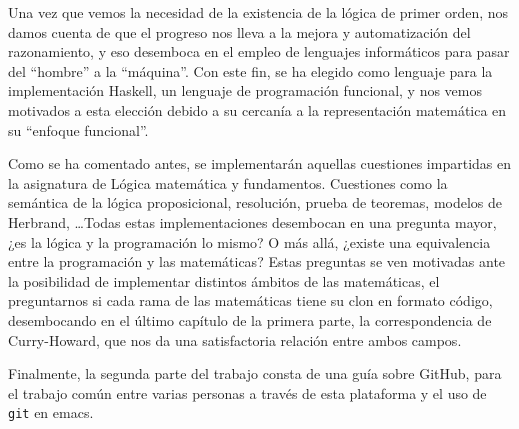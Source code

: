 Una vez que vemos la necesidad de la existencia de la lógica de primer orden,
nos damos cuenta de que el progreso nos lleva a la mejora y automatización del
razonamiento, y eso desemboca en el empleo de lenguajes informáticos para pasar
del ``hombre'' a la ``máquina''. Con este fin, se ha elegido como lenguaje para
la implementación Haskell, un lenguaje de programación funcional, y nos vemos
motivados a esta elección debido a su cercanía a la representación matemática
en su ``enfoque funcional''.

Como se ha comentado antes, se implementarán aquellas cuestiones impartidas en
la asignatura de Lógica matemática y fundamentos. Cuestiones como la semántica
de la lógica proposicional, resolución, prueba de teoremas, modelos de
Herbrand, \dots Todas estas implementaciones desembocan en una pregunta mayor,
¿es la lógica y la programación lo mismo? O más allá, ¿existe una equivalencia
entre la programación y las matemáticas? Estas preguntas se ven motivadas ante
la posibilidad de implementar distintos ámbitos de las matemáticas, el
preguntarnos si cada rama de las matemáticas tiene su clon en formato código,
desembocando en el último capítulo de la primera parte, la correspondencia de
Curry-Howard, que nos da una satisfactoria relación entre ambos campos.

Finalmente, la segunda parte del trabajo consta de una guía sobre GitHub, para
el trabajo común entre varias personas a través de esta plataforma y el uso de
\texttt{git} en emacs.



